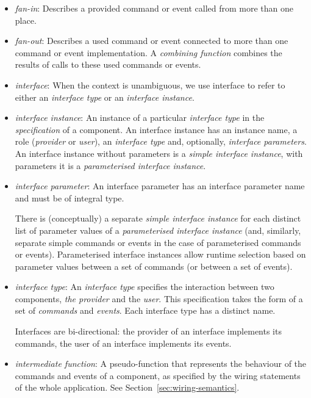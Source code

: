 \documentclass[11pt,letterpaper]{article}
\begin{document}
\begin{itemize}
\item \emph{fan-in}: Describes a provided command or event called from more
than one place.

\item \emph{fan-out}: Describes a used command or event connected to more
than one command or event implementation. A \emph{combining function}
combines the results of calls to these used commands or events.

\item \emph{interface}: When the context is unambiguous, we use interface
to refer to either an \emph{interface type} or an \emph{interface instance}.

\item \emph{interface instance}: An instance of a particular
\emph{interface type} in the \emph{specification} of a component. An
interface instance has an instance name, a role (\emph{provider} or
\emph{user}), an \emph{interface type} and, optionally, \emph{interface
parameters}. An interface instance without parameters is a \emph{simple
interface instance}, with parameters it is a \emph{parameterised interface
instance}.

\item \emph{interface parameter}: An interface parameter has an interface
parameter name and must be of integral type. 

There is (conceptually) a separate \emph{simple interface instance} for
each distinct list of parameter values of a \emph{parameterised interface
instance} (and, similarly, separate simple commands or events in the case
of parameterised commands or events). Parameterised interface instances
allow runtime selection based on parameter values between a set of commands
(or between a set of events).

\item \emph{interface type}: An \emph{interface type} specifies the
interaction between two components, \emph{the provider} and the
\emph{user}. This specification takes the form of a set of \emph{commands}
and \emph{events}. Each interface type has a distinct name. 

Interfaces are bi-directional: the provider of an interface implements its
commands, the user of an interface implements its events.

\item \emph{intermediate function}: A pseudo-function that represents the
behaviour of the commands and events of a component, as specified by the
wiring statements of the whole application. See
Section~\ref{sec:wiring-semantics}.


\end{itemize}
\end{document}
